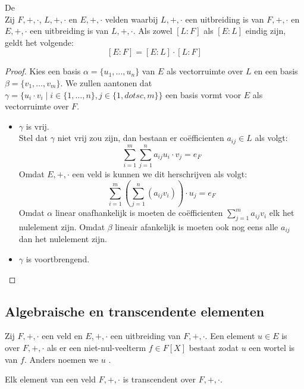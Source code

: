 \documentclass[main.tex]{subfiles}
\begin{document}
\begin{st}
  \label{st:productformule}
  De \\
  Zij $F,+,\cdot$, $L,+,\cdot$ en $E,+,\cdot$ velden waarbij $L,+,\cdot$ een uitbreiding is van $F,+,\cdot$ en $E,+,\cdot$ een uitbreiding is van $L,+,\cdot$.
  Als zowel $[L:F]$ als $[E:L]$ eindig zijn, geldt het volgende:
  \[ [E:F] = [E:L] \cdot [L:F]\]

  \begin{proof}
    Kies een basis $\alpha = \{ u_{1},\dotsc,u_{n}\}$ van $E$ als vectorruimte over $L$ en een basis $\beta = \{ v_{1},\dotsc,v_{m}\}$.
    We zullen aantonen dat $\gamma = \{ u_{i}\cdot v_{i} \mid i\in \{1,\dotsc,n\}, j \in \{1,dotsc,m\} \}$ een basis vormt voor $E$ als vectorruimte over $F$.
  \begin{itemize}
  \item $\gamma$ is vrij.\\
    Stel dat $\gamma$ niet vrij zou zijn, dan bestaan er co\"efficienten $a_{ij}\in L$ als volgt:
    \[ \sum_{i=1}^{m}\sum_{j=1}^{n}a_{ij}u_{i}\cdot v_{j} = e_{F} \]
    Omdat $E,+,\cdot$ een veld is kunnen we dit herschrijven als volgt:
    \[ \sum_{i=1}^{m}\left(\sum_{j=1}^{n}(a_{ij}v_{i})\right)\cdot u_{j} = e_{F} \]
    Omdat $\alpha$ linear onafhankelijk is moeten de co\"efficienten $\sum_{j=1}^{m}a_{ij}v_{i}$ elk het nulelement zijn.
    Omdat $\beta$ lineair afankelijk is moeten ook nog eens alle $a_{ij}$ dan het nulelement zijn.
  \item $\gamma$ is voortbrengend.\\
  \end{itemize}
\end{proof}
\end{st}

\subsection{Algebraische en transcendente elementen}
\label{sec:algebr-en-transc}

\begin{de}
  Zij $F,+,\cdot$ een veld en $E,+,\cdot$ een uitbreiding van $F,+,\cdot$.
  Een element $u\in E$ is  over $F,+,\cdot$ als er een niet-nul-veelterm $f\in F[X]$ bestaat zodat $u$ een wortel is van $f$.
  Anders noemen we $u$ .
\end{de}

\begin{st}
  Elk element van een veld $F,+,\cdot$ is transcendent over $F,+,\cdot$.
\end{st}
\end{document}
